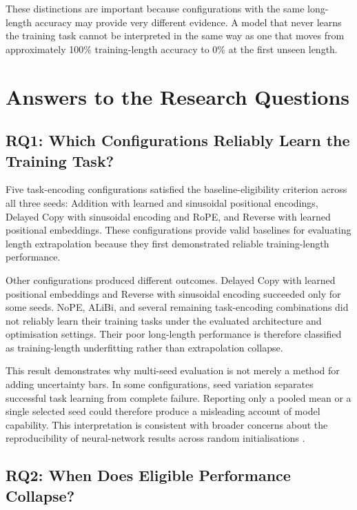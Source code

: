 \documentclass[
    author={Aanchala Ravindra Bhongade},
    supervisor={Dr. Fernando Moreno-Pino},
    degree={MSc},
    title={Length Generalisation in Transformer-Based Sequence Models: Failure Taxonomy and Mitigation Strategies},
    subtitle={},
    type={},
    year={2026}
]{dissertation}
\begin{document}
These distinctions are important because configurations with the same long-length accuracy may provide very different evidence. A model that never learns the training task cannot be interpreted in the same way as one that moves from approximately 100\% training-length accuracy to 0\% at the first unseen length.

\section{Answers to the Research Questions}
\label{sec:discussion-research-questions}

\subsection{RQ1: Which Configurations Reliably Learn the Training Task?}

Five task-encoding configurations satisfied the baseline-eligibility criterion across all three seeds: Addition with learned and sinusoidal positional encodings, Delayed Copy with sinusoidal encoding and RoPE, and Reverse with learned positional embeddings. These configurations provide valid baselines for evaluating length extrapolation because they first demonstrated reliable training-length performance.

Other configurations produced different outcomes. Delayed Copy with learned positional embeddings and Reverse with sinusoidal encoding succeeded only for some seeds. NoPE, ALiBi, and several remaining task-encoding combinations did not reliably learn their training tasks under the evaluated architecture and optimisation settings. Their poor long-length performance is therefore classified as training-length underfitting rather than extrapolation collapse.

This result demonstrates why multi-seed evaluation is not merely a method for adding uncertainty bars. In some configurations, seed variation separates successful task learning from complete failure. Reporting only a pooled mean or a single selected seed could therefore produce a misleading account of model capability. This interpretation is consistent with broader concerns about the reproducibility of neural-network results across random initialisations \cite{reimers2017reporting}.

\subsection{RQ2: When Does Eligible Performance Collapse?}
\end{document}
